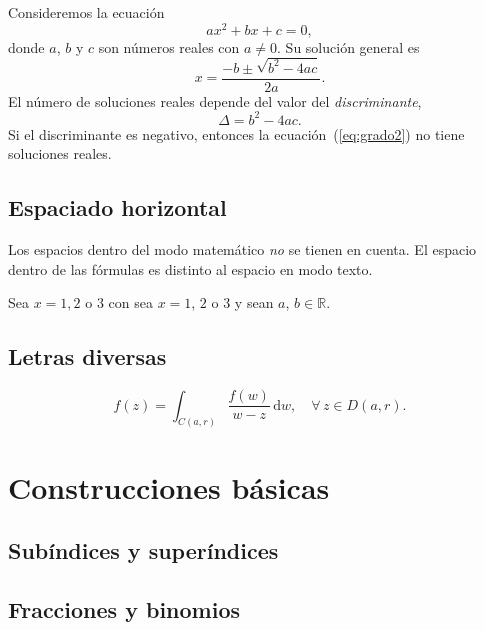 \documentclass{article}
\numberwithin{equation}{section}
\theoremstyle{plain}
\theoremstyle{definition}
\theoremstyle{remark}
\begin{document}
Consideremos la ecuación 
\begin{equation} \label{eq:grado2}
    ax^2+bx+c=0,
\end{equation}
donde \(a\), \(b\) y \(c\) son números reales con $a \neq 0$. Su solución 
general es
\begin{equation} \label{eq:solucion}
    x=\frac{-b \pm \sqrt{b^2-4ac}}{2a}. \tag{Solución}
\end{equation}
El número de soluciones reales depende del valor del \emph{discriminante}, 
\[
    \Delta = b^2-4ac.
\]
Si el discriminante es negativo, entonces la ecuación~(\ref{eq:grado2}) no 
tiene soluciones reales.






\subsection{Espaciado horizontal}

Los espacios dentro del modo matemático \emph{no} se tienen en cuenta. El espacio dentro de las fórmulas es distinto al espacio en modo texto.


Sea $x=1,2$ o $3$ con sea $x=1$, $2$ o $3$ y sean $a$, $b\in \mathbb{R}$.




\subsection{Letras diversas}




\[ 
	f(z)=\int_{C(a,r)} \frac{f(w)}{w-z} \,\mathrm{d} w, \quad \forall\, z \in D(a,r).
\]


\section{Construcciones básicas}

\subsection{Subíndices y superíndices}




\subsection{Fracciones y binomios} 
\end{document}
